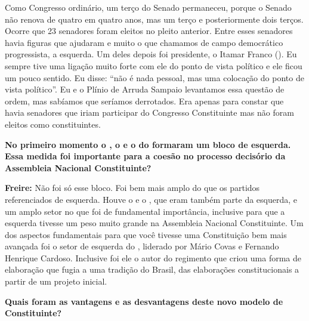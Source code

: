 Como Congresso ordinário, um terço do Senado permaneceu, porque o Senado
não renova de quatro em quatro anos, mas um terço e posteriormente dois
terços. Ocorre que 23 senadores foram eleitos no pleito anterior. Entre
esses senadores havia figuras que ajudaram e muito o que chamamos de
campo democrático progressista, a esquerda. Um deles depois foi
presidente, o Itamar Franco (). Eu sempre tive uma ligação muito
forte com ele do ponto de vista político e ele ficou um pouco sentido.
Eu disse: ``não é nada pessoal, mas uma colocação do ponto de vista
político''. Eu e o Plínio de Arruda Sampaio levantamos essa questão de
ordem, mas sabíamos que seríamos derrotados. Era apenas para constar que
havia senadores que iriam participar do Congresso Constituinte mas não
foram eleitos como constituintes.

\textbf{No primeiro momento o , o  e o do formaram um bloco de
esquerda. Essa medida foi importante para a coesão no processo decisório
da Assembleia Nacional Constituinte?}

\textbf{Freire:} Não foi só esse bloco. Foi bem mais amplo do que os
partidos referenciados de esquerda. Houve o  e o , que eram também
parte da esquerda, e um amplo setor no  que foi de fundamental
importância, inclusive para que a esquerda tivesse um peso muito grande
na Assembleia Nacional Constituinte. Um dos aspectos fundamentais para
que você tivesse uma Constituição bem mais avançada foi o setor de
esquerda do , liderado por Mário Covas e Fernando Henrique Cardoso.
Inclusive foi ele o autor do regimento que criou uma forma de elaboração
que fugia a uma tradição do Brasil, das elaborações constitucionais a
partir de um projeto inicial.

\textbf{Quais foram as vantagens e as desvantagens deste novo modelo de
Constituinte?}

